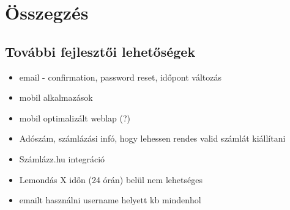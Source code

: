 \chapter{Összegzés} %
\label{ch:sum}



\section{További fejlesztői lehetőségek}
\begin{itemize}
    \item email - confirmation, password reset, időpont változás
    \item mobil alkalmazások
    \item mobil optimalizált weblap (?) 
    \item Adószám, számlázási infó, hogy lehessen rendes valid számlát kiállítani
    \item Számlázz.hu integráció
    \item Lemondás X időn (24 órán) belül nem lehetséges
    \item emailt használni username helyett kb mindenhol
\end{itemize}


